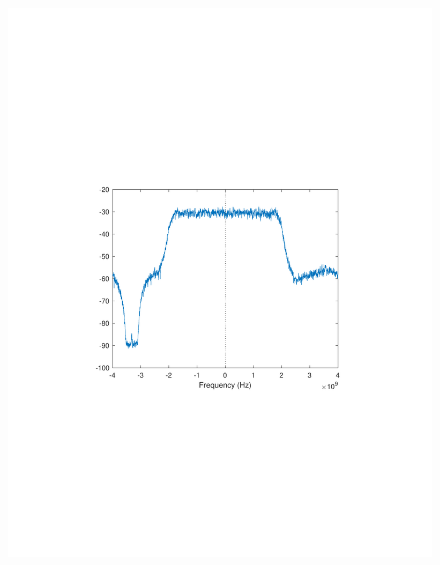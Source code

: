 \begin{refsection}
\begin{figure}[H]
	\centering
	\begin{minipage}{0.30\textwidth}
		\centering
		\includegraphics[clip, trim=4cm 8cm 4cm 8cm, width=1\textwidth]{./sdf/m_qam_system/figures/expResults/intradyne/4_4GBdInSig13dB_AfFE.pdf}
		\label{fig:4GBdEyeFE2}
	\end{minipage}
	\begin{minipage}{0.30\textwidth}
		\centering

\end{minipage}
\end{figure}
\end{refsection}
